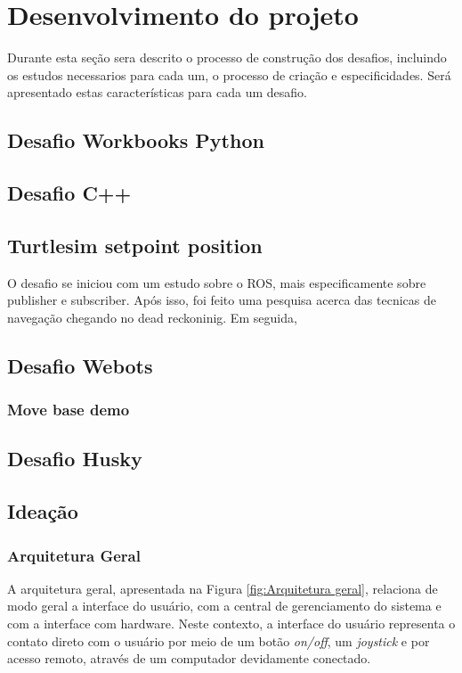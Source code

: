 \chapter{Desenvolvimento do projeto}
\label{chap:metod}

Durante esta seção sera descrito o processo de construção dos desafios, incluindo os estudos necessarios para cada um, o processo de criação e especificidades. Será apresentado estas características para cada um desafio.

\section{Desafio Workbooks Python}

\section{Desafio C++}

\section{Turtlesim setpoint position}

O desafio se iniciou com um estudo sobre o ROS, mais especificamente sobre publisher e subscriber. Após isso, foi feito uma pesquisa acerca das tecnicas de navegação chegando no dead reckoninig. Em seguida, 


\section{Desafio Webots}

\subsection{Move base demo}

\section{Desafio Husky}



\section{Ideação}

\subsection{Arquitetura Geral}
 A arquitetura geral, apresentada na Figura \ref{fig:Arquitetura geral}, 
 relaciona de modo geral a interface do usuário, com a central de 
 gerenciamento do sistema e com a interface com hardware. Neste contexto, 
 a interface do usuário representa o contato direto com o usuário por meio 
 de um botão \textit{on/off}, um \textit{joystick} e por acesso remoto, 
 através de um computador devidamente conectado.

